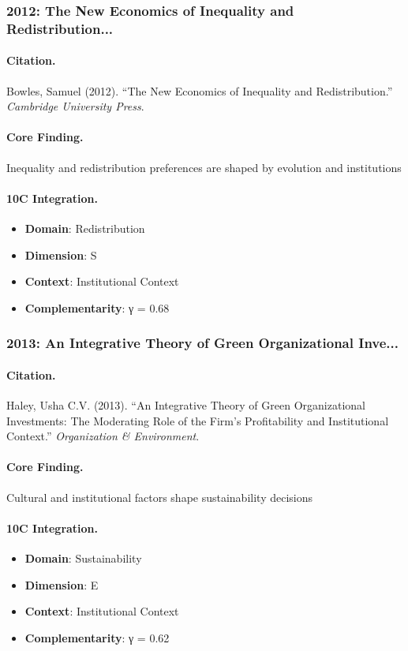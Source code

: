 \subsubsection{2012: The New Economics of Inequality and Redistribution...}

\paragraph{Citation.}
Bowles, Samuel (2012). ``The New Economics of Inequality and Redistribution.''
\textit{Cambridge University Press}.

\paragraph{Core Finding.}
Inequality and redistribution preferences are shaped by evolution and institutions

\paragraph{10C Integration.}
\begin{itemize}[nosep]
  \item \textbf{Domain}: Redistribution
  \item \textbf{Dimension}: S
  \item \textbf{Context}: Institutional Context
  \item \textbf{Complementarity}: γ = 0.68
\end{itemize}

\subsubsection{2013: An Integrative Theory of Green Organizational Inve...}

\paragraph{Citation.}
Haley, Usha C.V. (2013). ``An Integrative Theory of Green Organizational Investments: The Moderating Role of the Firm's Profitability and Institutional Context.''
\textit{Organization & Environment}.

\paragraph{Core Finding.}
Cultural and institutional factors shape sustainability decisions

\paragraph{10C Integration.}
\begin{itemize}[nosep]
  \item \textbf{Domain}: Sustainability
  \item \textbf{Dimension}: E
  \item \textbf{Context}: Institutional Context
  \item \textbf{Complementarity}: γ = 0.62
\end{itemize}


